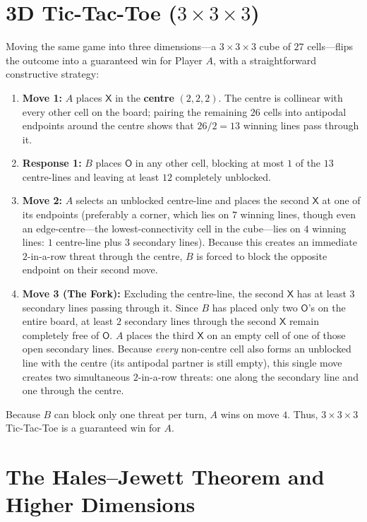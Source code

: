 \documentclass[11pt, a4paper]{article}
\begin{document}
\section{3D Tic-Tac-Toe ($3 \times 3 \times 3$)}
Moving the same game into three dimensions—a $3 \times 3 \times 3$ cube of $27$ cells—flips the outcome into a guaranteed win for Player $A$, with a straightforward constructive strategy:
\begin{enumerate}
    \item \textbf{Move 1:} $A$ places $\mathsf{X}$ in the \textbf{centre} $(2,2,2)$. The centre is collinear with every other cell on the board; pairing the remaining $26$ cells into antipodal endpoints around the centre shows that $26 / 2 = 13$ winning lines pass through it.
    \item \textbf{Response 1:} $B$ places $\mathsf{O}$ in any other cell, blocking at most $1$ of the $13$ centre-lines and leaving at least $12$ completely unblocked.
    \item \textbf{Move 2:} $A$ selects an unblocked centre-line and places the second $\mathsf{X}$ at one of its endpoints (preferably a corner, which lies on $7$ winning lines, though even an edge-centre—the lowest-connectivity cell in the cube—lies on $4$ winning lines: $1$ centre-line plus $3$ secondary lines). Because this creates an immediate $2$-in-a-row threat through the centre, $B$ is forced to block the opposite endpoint on their second move.
    \item \textbf{Move 3 (The Fork):} Excluding the centre-line, the second $\mathsf{X}$ has at least $3$ secondary lines passing through it. Since $B$ has placed only two $\mathsf{O}$'s on the entire board, at least $2$ secondary lines through the second $\mathsf{X}$ remain completely free of $\mathsf{O}$. $A$ places the third $\mathsf{X}$ on an empty cell of one of those open secondary lines. Because \emph{every} non-centre cell also forms an unblocked line with the centre (its antipodal partner is still empty), this single move creates two simultaneous $2$-in-a-row threats: one along the secondary line and one through the centre.
\end{enumerate}
Because $B$ can block only one threat per turn, $A$ wins on move $4$. Thus, $3 \times 3 \times 3$ Tic-Tac-Toe is a guaranteed win for $A$.

\section{The Hales--Jewett Theorem and Higher Dimensions}
\end{document}
